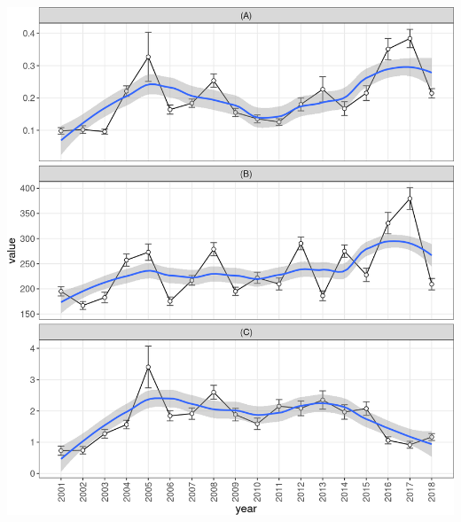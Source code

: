 \documentclass[10pt,landscape,a3paper]{article}
\begin{document}
\begin{center}\includegraphics{img/modelling/aa-eda-ts-6} \end{center}
\end{document}
